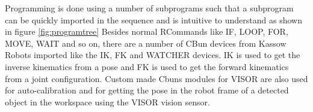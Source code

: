 Programming is done using a number of subprograms such that a subprogram
can be quickly imported in the sequence and is intuitive to understand as shown in figure \ref{fig:programtree}
Besides normal RCommands like IF, LOOP, FOR, MOVE, WAIT and so on, there are a number of CBun devices
from Kassow Robots
imported like the IK, FK and WATCHER devices. IK is used to get the inverse
kinematics from a pose and FK is used to get the forward kinematics
from a joint configuration.
Custom made Cbuns modules for VISOR
are also used for auto-calibration and for getting the pose in the
robot frame of a detected object in the workspace using the VISOR vision sensor.

